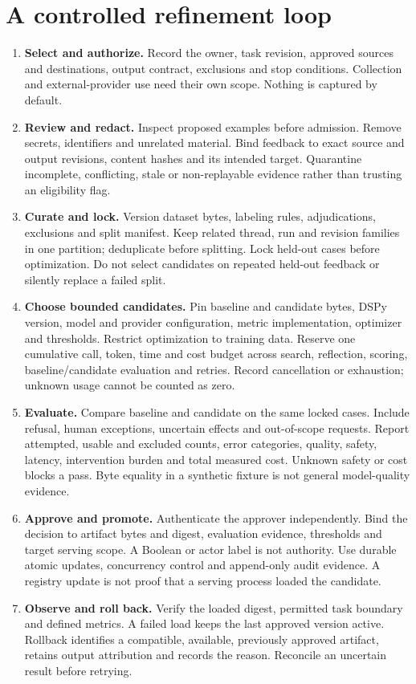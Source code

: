 \documentclass[11pt]{article}
\begin{document}
\section{A controlled refinement loop}
\begin{enumerate}
\item \textbf{Select and authorize.} Record the owner, task revision, approved sources and destinations, output contract, exclusions and stop conditions. Collection and external-provider use need their own scope. Nothing is captured by default.
\item \textbf{Review and redact.} Inspect proposed examples before admission. Remove secrets, identifiers and unrelated material. Bind feedback to exact source and output revisions, content hashes and its intended target. Quarantine incomplete, conflicting, stale or non-replayable evidence rather than trusting an eligibility flag.
\item \textbf{Curate and lock.} Version dataset bytes, labeling rules, adjudications, exclusions and split manifest. Keep related thread, run and revision families in one partition; deduplicate before splitting. Lock held-out cases before optimization. Do not select candidates on repeated held-out feedback or silently replace a failed split.
\item \textbf{Choose bounded candidates.} Pin baseline and candidate bytes, DSPy version, model and provider configuration, metric implementation, optimizer and thresholds. Restrict optimization to training data. Reserve one cumulative call, token, time and cost budget across search, reflection, scoring, baseline/candidate evaluation and retries. Record cancellation or exhaustion; unknown usage cannot be counted as zero.
\item \textbf{Evaluate.} Compare baseline and candidate on the same locked cases. Include refusal, human exceptions, uncertain effects and out-of-scope requests. Report attempted, usable and excluded counts, error categories, quality, safety, latency, intervention burden and total measured cost. Unknown safety or cost blocks a pass. Byte equality in a synthetic fixture is not general model-quality evidence.
\item \textbf{Approve and promote.} Authenticate the approver independently. Bind the decision to artifact bytes and digest, evaluation evidence, thresholds and target serving scope. A Boolean or actor label is not authority. Use durable atomic updates, concurrency control and append-only audit evidence. A registry update is not proof that a serving process loaded the candidate.
\item \textbf{Observe and roll back.} Verify the loaded digest, permitted task boundary and defined metrics. A failed load keeps the last approved version active. Rollback identifies a compatible, available, previously approved artifact, retains output attribution and records the reason. Reconcile an uncertain result before retrying.
\end{enumerate}
\clearpage
\end{document}
